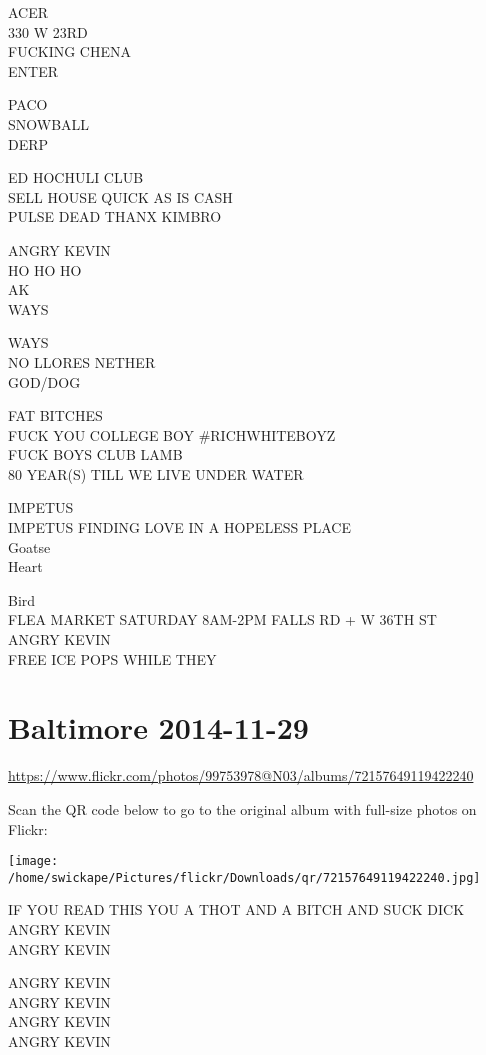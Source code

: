 \documentclass[10pt,letterpaper]{article}
\begin{document}
ACER\\
330 W 23RD\\
FUCKING CHENA\\
ENTER

PACO\\
SNOWBALL\\
DERP

ED HOCHULI CLUB\\
SELL HOUSE QUICK AS IS CASH\\
PULSE DEAD THANX KIMBRO

ANGRY KEVIN\\
HO HO HO\\
AK\\
WAYS

WAYS\\
NO LLORES NETHER\\
GOD/DOG

FAT BITCHES\\
FUCK YOU COLLEGE BOY \#RICHWHITEBOYZ\\
FUCK BOYS CLUB LAMB\\
80 YEAR(S) TILL WE LIVE UNDER WATER

IMPETUS\\
IMPETUS FINDING LOVE IN A HOPELESS PLACE\\
Goatse\\
Heart

Bird\\
FLEA MARKET SATURDAY 8AM{-}2PM FALLS RD + W 36TH ST\\
ANGRY KEVIN\\
FREE ICE POPS WHILE THEY
\pagebreak

\section*{Baltimore 2014-11-29}

\url{https://www.flickr.com/photos/99753978@N03/albums/72157649119422240}

Scan the QR code below to go to the original album with full-size photos on Flickr:

\texttt{[image: /home/swickape/Pictures/flickr/Downloads/qr/72157649119422240.jpg]}
\pagebreak

IF YOU READ THIS YOU A THOT AND A BITCH AND SUCK DICK\\
ANGRY KEVIN\\
ANGRY KEVIN

ANGRY KEVIN\\
ANGRY KEVIN\\
ANGRY KEVIN\\
ANGRY KEVIN
\end{document}
